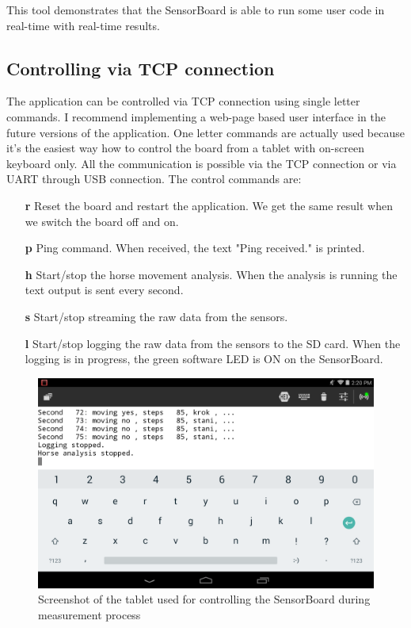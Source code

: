 This tool demonstrates that the SensorBoard is able to run some user code in real-time with real-time results.

\subsection{Controlling via \ac{TCP} connection}
The application can be controlled via \ac{TCP} connection using single letter commands. I recommend implementing a web-page based user interface in the future versions of the application. One letter commands are actually used because it's the easiest way how to control the board from a tablet with on-screen keyboard only. All the communication is possible via the \ac{TCP} connection or via UART through USB connection. The control commands are:

\begin{itemize}
	\item[\textbf{r}] Reset the board and restart the application. We get the same result when we switch the board off and on.
	\item[\textbf{p}] Ping command. When received, the text "Ping received." is printed.
	\item[\textbf{h}] Start/stop the horse movement analysis. When the analysis is running the text output is sent every second.
	\item[\textbf{s}] Start/stop streaming the raw data from the sensors.
	\item[\textbf{l}] Start/stop logging the raw data from the sensors to the SD card. When the logging is in progress, the green software LED is ON on the SensorBoard.
\end{itemize}

\begin{figure}[H]
	\centering
	\label{fig:HorseAnalysisTablet}
	\caption{Screenshot of the tablet used for controlling the SensorBoard during measurement process}
	\includegraphics[width=\linewidth]{img/HorseAnalysisTablet.png}
\end{figure}

